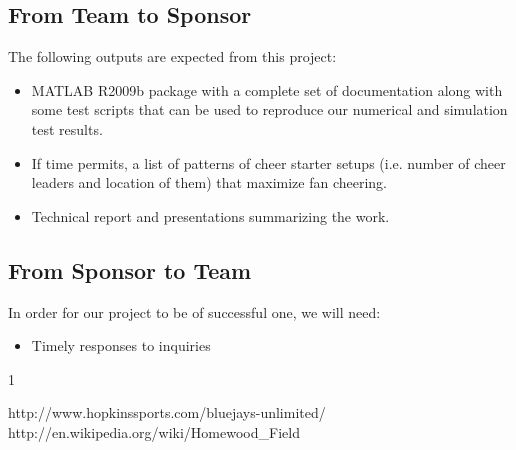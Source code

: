 \documentclass[12pt,letterpaper]{article}
\theoremstyle{definition}
\begin{document}
\subsection{From Team to Sponsor} %
The following outputs are expected from this project:
\begin{itemize}
    \item MATLAB R2009b package with a complete set of documentation along with some test 
        scripts that can be used to reproduce our numerical and simulation test
        results.
    \item If time permits, a list of patterns of cheer starter setups (i.e. number of cheer leaders and location of them) that maximize fan cheering.
    \item Technical report and presentations summarizing the work. 
\end{itemize}

\subsection{From Sponsor to Team} %

In order for our project to be of successful one, we will need:
\begin{itemize}
    \item Timely responses to inquiries 
\end{itemize}


\newpage
\begin{thebibliography} {1}


 http://www.hopkinssports.com/bluejays-unlimited/
 http://en.wikipedia.org/wiki/Homewood\_Field
%
\end{thebibliography}
\end{document}
